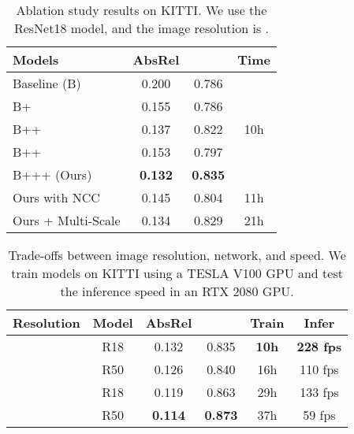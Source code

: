 \documentclass[twocolumn]{svjour3}
\begin{document}
\begin{table}[t]
  \setlength{\tabcolsep}{1mm}
  \caption{Ablation study results on KITTI. We use the ResNet18 model, and the image resolution is .
  }\label{tab:ablation}
  \centering
  \begin{tabular}{l|c c c }
    \hline
    Models & AbsRel &  & Time \\
    \hline
    Baseline (B)  & 0.200 & 0.786 & \multirow{5}{*}{10h} \\
    B+  & 0.155 & 0.786 & \\
    B++ & 0.137 & 0.822 &  \\
    B++ & 0.153 & 0.797 &  \\
    B+++ (Ours) & \textbf{0.132} & \textbf{0.835} &  \\
    \hline
    Ours with NCC & 0.145 & 0.804 & 11h \\
Ours + Multi-Scale & 0.134 & 0.829 & 21h \\
    \hline
  \end{tabular}
\end{table}


\begin{table}[t]
  \setlength{\tabcolsep}{1mm}
  \caption{Trade-offs between image resolution, network, and speed.
    We train models on KITTI using a TESLA V100 GPU and test the inference 
    speed in an RTX 2080 GPU.
  }\label{tab:network-resolution}
  \centering
  \begin{tabular}{l c |c c c c} \hline
    Resolution & Model & AbsRel &  & Train  & Infer \\ \hline
    \multirow{2}{*}{ } & R18 & 0.132 & 0.835 & \textbf{10h} & \textbf{228 fps} \\
    & R50 & 0.126 & 0.840 & 16h & 110 fps \\ \cline{1-2}
    \multirow{2}{*}{} & R18 & 0.119 & 0.863 & 29h & 133 fps \\
    & R50 & \textbf{0.114} & \textbf{0.873} &  37h & 59 fps\\ \hline
  \end{tabular}
\end{table}
\end{document}
